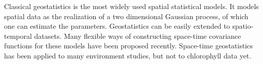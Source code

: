 Classical geostatistics is the most widely used spatial statistical models. It models spatial data as the realization of a two dimensional Gaussian process, of which one can estimate the parameters. Geostatistics can be easily extended to spatio-temporal datasets. Many flexible ways of constructing space-time covariance functions for these models have been proposed recently. Space-time geostatistics has been applied to many environment studies, but not to chlorophyll data yet.

